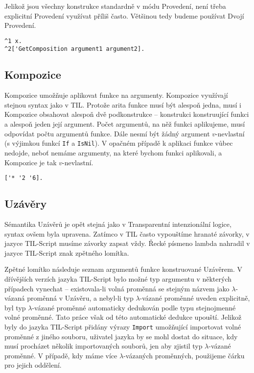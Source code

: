 Jelikož jsou všechny konstrukce standardně v módu Provedení, není třeba explicitní Provedení
využívat příliš často. Většinou tedy budeme používat Dvojí Provedení.

\begin{lstlisting}[caption={Příklad využití Provedení}]
^1 x.
^2['GetComposition argument1 argument2].
\end{lstlisting}

\subsection{Kompozice}

Kompozice umožňuje aplikovat funkce na argumenty. Kompozice využívají stejnou syntax jako v TIL.
Protože arita funkce musí být alespoň jedna, musí i Kompozice obsahovat alespoň dvě podkonstrukce
-- konstrukci konstruující funkci a alespoň jeden její argument. Počet argumentů, na něž funkci
aplikujeme, musí odpovídat počtu argumentů funkce. Dále nesmí být žádný argument $v$-nevlastní
(s výjimkou funkcí \lstinline{If} a \lstinline{IsNil}). V opačném případě k aplikaci funkce vůbec
nedojde, neboť nemáme argumenty, na které bychom funkci aplikovali, a Kompozice je tak
$v$-nevlastní.

\begin{lstlisting}[caption={Příklad využití Kompozice}]
['* '2 '6].
\end{lstlisting}

\subsection{Uzávěry}

Sémantika Uzávěrů je opět stejná jako v Transparentní intenzionální logice, syntax ovšem byla
upravena. Zatímco v TIL často vypouštíme hranaté závorky, v jazyce TIL-Script musíme závorky zapsat
vždy. Řecké písmeno lambda nahradil v jazyce TIL-Script znak zpětného lomítka.

Zpětné lomítko následuje seznam argumentů funkce konstruované Uzávěrem. V dřívějších verzích jazyka
TIL-Script bylo možné typ argumentu v některých případech vynechat -- existovala-li volná proměnná
se stejným názvem jako $\lambda$-vázaná proměnná v Uzávěru, a nebyl-li typ $\lambda$-vázané
proměnné uveden explicitně, byl typ $\lambda$-vázané proměnné automaticky dedukován podle typu
stejnojmenné volné proměnné. Tato práce však od této automatické dedukce upouští. Jelikož byly
do jazyka TIL-Script přidány výrazy \lstinline{Import} umožňující importovat volné proměnné z jiného
souboru, uživatel jazyka by se mohl dostat do situace, kdy musí procházet několik
importovaných souborů, jen aby zjistil typ $\lambda$-vázané proměnné. V případě, kdy máme více
$\lambda$-vázaných proměnných, použijeme čárku pro jejich oddělení.

